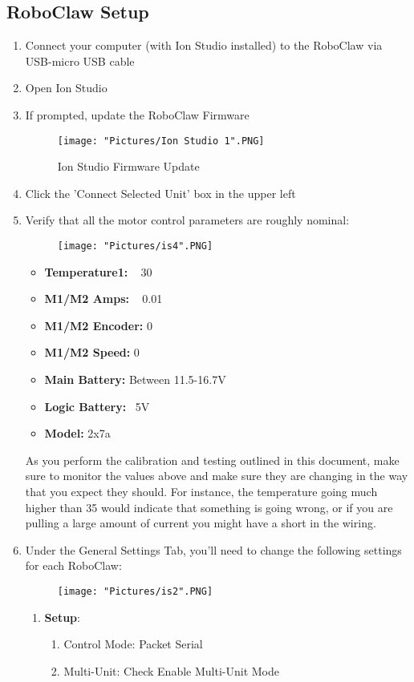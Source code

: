 \documentclass[12pt]{article}
\begin{document}
\subsection{RoboClaw Setup}
\begin{enumerate}
	\item Connect your computer (with Ion Studio installed) to the RoboClaw via USB-micro USB cable
	\item Open Ion Studio
	\item If prompted, update the RoboClaw Firmware
	\begin{figure}[H]
 		\centering
		\texttt{[image: "Pictures/Ion Studio 1".PNG]}
 		\caption{Ion Studio Firmware Update}
	\end{figure}
	
	\item Click the 'Connect Selected Unit' box in the upper left
	\item Verify that all the motor control parameters are roughly nominal:
	\begin{figure}[H]
 		\centering
		\texttt{[image: "Pictures/is4".PNG]}
 		\caption{}
	\end{figure}
	\begin{itemize}
		\item \textbf{Temperature1:} ~ 30
		\item \textbf{M1/M2 Amps:} ~ 0.01
		\item \textbf{M1/M2 Encoder:} 0
		\item \textbf{M1/M2 Speed:} 0
		\item \textbf{Main Battery:} Between 11.5-16.7V
		\item \textbf{Logic Battery:} ~5V
		\item \textbf{Model:} 2x7a
	\end{itemize}
	\noindent As you perform the calibration and testing outlined in this document, make sure to monitor the values above and make sure they are changing in the way that you expect they should. For instance, the temperature going much higher than 35 would indicate that something is going wrong, or if you are pulling a large amount of current you might have a short in the wiring. 
	\item Under the General Settings Tab, you'll need to change the following settings for each RoboClaw:
	\begin{figure}[H]
 		\centering
		\texttt{[image: "Pictures/is2".PNG]}
 		\caption{}
	\end{figure}
	\begin{enumerate}
		\item \textbf{Setup}:
		\begin{enumerate}
			\item Control Mode: Packet Serial
			\item Multi-Unit: Check Enable Multi-Unit Mode
		\end{enumerate}


\end{enumerate}
\end{enumerate}
\end{document}
